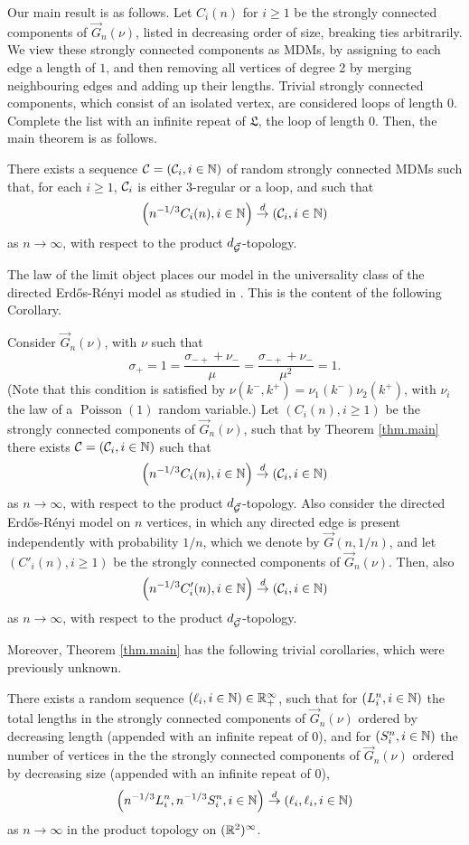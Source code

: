 Our main result is as follows. Let $C_i(n)$ for $i\geq 1$ be the strongly connected components of $\vec{G}_n(\nu)$, listed in decreasing order of size, breaking ties arbitrarily. We view these strongly connected components as MDMs, by assigning to each edge a length of $1$, and then removing all vertices of degree 2 by merging neighbouring edges and adding up their lengths. Trivial strongly connected components, which consist of an isolated vertex, are considered loops of length $0$. Complete the list with an infinite repeat of $\mathfrak{L}$, the loop of length $0$. Then, the main theorem is as follows.
\begin{theorem}\label{thm.main}
There exists a sequence ${\mathcal C}=({\mathcal C}_i,i\in {\mathbb N})$ of random strongly connected MDMs such that, for each $i\geq 1$, ${\mathcal C}_i$ is either $3$-regular or a loop, and such that 
$$\left(n^{-1/3}C_i(n),i\in {\mathbb N}\right)\overset{d}{\to}\left({\mathcal C}_i,i\in {\mathbb N}\right)$$
as $n\to \infty$, with respect to the product $d_{\vec{{\mathcal G}}}$-topology. 
\end{theorem}
The law of the limit object places our model in the universality class of the directed Erd\H{o}s-Rényi model as studied in \cite{goldschmidtScalingLimitCritical2019}. This is the content of the following Corollary.
\begin{corollary}
Consider $\vec{G}_n(\nu)$, with $\nu$ such that $$\sigma_+=1=\frac{\sigma_{-+}+\nu_-}{\mu}=\frac{\sigma_{-+}+\nu_-}{\mu^2}=1.$$ (Note that this condition is satisfied by $\nu(k^-,k^+)=\nu_1(k^-)\nu_2(k^+)$, with $\nu_i$ the law of a $\operatorname{Poisson}(1)$ random variable.)
Let $(C_i(n), i\geq 1)$ be the strongly connected components of $\vec{G}_n(\nu)$, such that by Theorem \ref{thm.main} there exists ${\mathcal C}=({\mathcal C}_i,i\in {\mathbb N})$ such that 
$$\left(n^{-1/3}C_i(n),i\in {\mathbb N}\right)\overset{d}{\to}\left({\mathcal C}_i,i\in {\mathbb N}\right)$$
as $n\to \infty$, with respect to the product $d_{\vec{{\mathcal G}}}$-topology. Also consider the directed Erd\H{o}s-R\'enyi model on $n$ vertices, in which any directed edge is present independently with probability $1/n$, which we denote by $\vec{G}(n,1/n)$, and let $(C'_i(n), i\geq 1)$ be the strongly connected components of $\vec{G}_n(\nu)$. Then, also
$$\left(n^{-1/3}C'_i(n),i\in {\mathbb N}\right)\overset{d}{\to}\left({\mathcal C}_i,i\in {\mathbb N}\right)$$
as $n\to \infty$, with respect to the product $d_{\vec{{\mathcal G}}}$-topology. 
\end{corollary}
Moreover, Theorem \ref{thm.main} has the following trivial corollaries, which were previously unknown. 
\begin{corollary}
There exists a random sequence $(\ell_i,i\in {\mathbb N})\in {\mathbb R}_+^\infty$, such that for $(L^n_i,i\in {\mathbb N})$ the total lengths in the strongly connected components of $\vec{G}_n(\nu)$ ordered by decreasing length (appended with an infinite repeat of $0$), and for $(S^n_i,i\in{\mathbb N})$ the number of vertices in the the strongly connected components of $\vec{G}_n(\nu)$ ordered by decreasing size (appended with an infinite repeat of $0$),
$$\left(n^{-1/3}L^n_i,n^{-1/3}S^n_i, i\in {\mathbb N}\right)\overset{d}{\to}\left(\ell_i,\ell_i,i\in {\mathbb N}\right)$$
as $n\to \infty$ in the product topology on $({\mathbb R}^2)^\infty$. 
\end{corollary}
